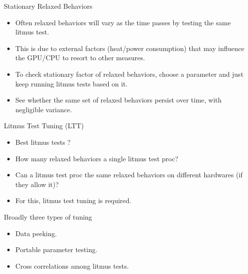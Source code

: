 \documentclass{beamer}
\begin{document}
    \begin{frame}{Stationary Relaxed Behaviors}

        \begin{itemize}
            \item Often relaxed behaviors will vary as the time passes by testing the same litmus test.
            \item This is due to external factors (heat/power consumption) that may influence the GPU/CPU to resort to other measures.
        \end{itemize}
        
        \begin{itemize}
            \item To check stationary factor of relaxed behaviors, choose a parameter and just keep running litmus tests based on it.
            \item See whether the same set of relaxed behaviors persist over time, with negligible variance. 
        \end{itemize}

        \begin{figure}
        \end{figure}

    \end{frame}

    \begin{frame}{Litmus Test Tuning (LTT)}

        \begin{itemize}
            \item Best litmus tests ? 
            \item How many relaxed behaviors a single litmus test proc? 
            \item Can a litmus test proc the same relaxed behaviors on different hardwares (if they allow it)? 
            \item For this, litmus test tuning is required.
        \end{itemize}
        
        Broadly three types of tuning
        \begin{itemize}
            \item Data peeking.
            \item Portable parameter testing.
            \item Cross correlations among litmus tests.
        \end{itemize}
        
    \end{frame}
\end{document}
